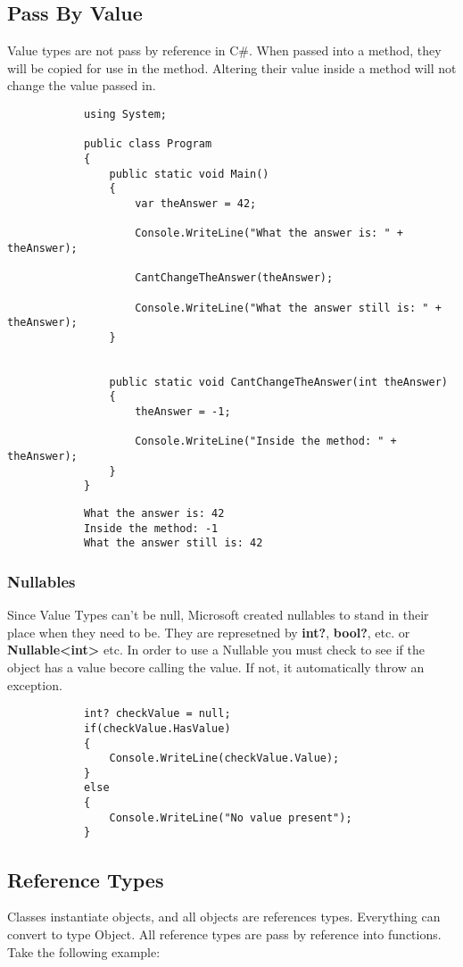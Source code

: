 \documentclass {amsart}
\begin{document}
		\subsection{Pass By Value}  Value types are not pass by reference in C\#. When passed into a method, they will be copied for use in the method.  Altering their value inside a method will not change the value passed in.

		\begin{lstlisting}
			using System;
								
			public class Program
			{
				public static void Main()
				{
					var theAnswer = 42;

					Console.WriteLine("What the answer is: " + theAnswer);
					
					CantChangeTheAnswer(theAnswer);
					
					Console.WriteLine("What the answer still is: " + theAnswer);
				}
				
				
				public static void CantChangeTheAnswer(int theAnswer)
				{
					theAnswer = -1;
					
					Console.WriteLine("Inside the method: " + theAnswer);
				}
			}
		\end{lstlisting}  

		\begin{verbatim}
			What the answer is: 42
			Inside the method: -1
			What the answer still is: 42
		\end{verbatim}

		\subsubsection{Nullables} Since Value Types can't be null, Microsoft created nullables to stand in their place when they need to be.  They are represetned by {\bf int?}, {\bf bool?}, etc. or {\bf Nullable\textless int\textgreater} \space etc.  In order to use a Nullable you must check to see if the object has a value becore calling the value.  If not, it automatically throw an exception.

		\begin{lstlisting}
			int? checkValue = null;
			if(checkValue.HasValue)
			{
				Console.WriteLine(checkValue.Value);
			}
			else
			{
				Console.WriteLine("No value present");
			}
		\end{lstlisting}

	\subsection{Reference Types}  Classes instantiate objects, and all objects are references types.  Everything can convert to type Object.  All reference types are pass by reference into functions.  Take the following example: 
\end{document}

